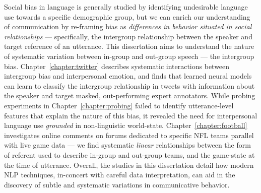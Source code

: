 Social bias in language is generally studied by identifying undesirable language use towards a specific demographic group, but we can enrich our understanding of communication by re-framing bias as \emph{differences in behavior situated in social relationships} --- specifically, the intergroup relationship between the speaker and target reference of an utterance. This dissertation aims to understand the nature of systematic variation between in-group and out-group speech --- the intergroup bias. Chapter~\ref{chapter:twitter} describes systematic interactions between intergroup bias and interpersonal emotion, and finds that learned neural models can learn to classify the intergroup relationship in tweets with information about the speaker and target masked, out-performing expert annotators. While probing experiments in Chapter~\ref{chapter:probing} failed to identify utterance-level features that explain the nature of this bias, it revealed the need for interpersonal language use \emph{grounded} in non-linguistic world-state. Chapter~\ref{chapter:football} investigates online comments on forums dedicated to specific NFL teams parallel with live game data --- we find systematic \emph{linear} relationships between the form of referent used to describe in-group and out-group teams, and the game-state at the time of utterance. Overall, the studies in this dissertation detail how modern NLP techniques, in-concert with careful data interpretation, can aid in the discovery of subtle and systematic variations in communicative behavior.
